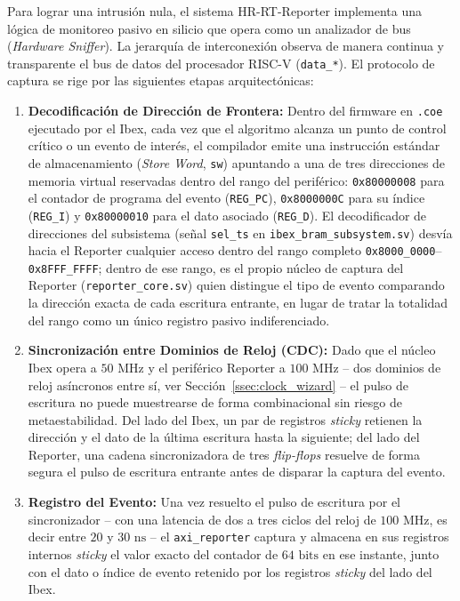Para lograr una intrusión nula, el sistema HR-RT-Reporter implementa una lógica de monitoreo pasivo en silicio que opera como un analizador de bus (\textit{Hardware Sniffer}). La jerarquía de interconexión observa de manera continua y transparente el bus de datos del procesador RISC-V (\texttt{data\_*}). El protocolo de captura se rige por las siguientes etapas arquitectónicas:
\begin{enumerate}
    \item \textbf{Decodificación de Dirección de Frontera:} Dentro del
  firmware en \texttt{.coe} ejecutado por el Ibex, cada vez que el
  algoritmo alcanza un punto de control crítico o un evento de interés, el
  compilador emite una instrucción estándar de almacenamiento
  (\textit{Store Word}, \texttt{sw}) apuntando a una de tres direcciones de
  memoria virtual reservadas dentro del rango del periférico:
  \texttt{0x80000008} para el contador de programa del evento
  (\texttt{REG\_PC}), \texttt{0x8000000C} para su índice
  (\texttt{REG\_I}) y \texttt{0x80000010} para el dato asociado
  (\texttt{REG\_D}). El decodificador de direcciones del subsistema
  (señal \texttt{sel\_ts} en \texttt{ibex\_bram\_subsystem.sv}) desvía
  hacia el Reporter cualquier acceso dentro del rango completo
  \texttt{0x8000\_0000}--\texttt{0x8FFF\_FFFF}; dentro de ese rango, es el
  propio núcleo de captura del Reporter (\texttt{reporter\_core.sv}) quien
  distingue el tipo de evento comparando la dirección exacta de cada
  escritura entrante, en lugar de tratar la totalidad del rango como un
  único registro pasivo indiferenciado.
    \item \textbf{Sincronización entre Dominios de Reloj (CDC):} Dado que
    el núcleo Ibex opera a $50\text{ MHz}$ y el periférico Reporter a
    $100\text{ MHz}$ -- dos dominios de reloj asíncronos entre sí, ver
    Sección~\ref{ssec:clock_wizard} -- el pulso de escritura no puede
    muestrearse de forma combinacional sin riesgo de metaestabilidad. Del
    lado del Ibex, un par de registros \textit{sticky} retienen la
    dirección y el dato de la última escritura hasta la siguiente; del
    lado del Reporter, una cadena sincronizadora de tres
    \textit{flip-flops} resuelve de forma segura el pulso de escritura
    entrante antes de disparar la captura del evento.
    \item \textbf{Registro del Evento:} Una vez resuelto el pulso de
    escritura por el sincronizador -- con una latencia de dos a tres
    ciclos del reloj de $100\text{ MHz}$, es decir entre $20$ y
    $30\text{ ns}$ -- el \texttt{axi\_reporter} captura y almacena en sus
    registros internos \textit{sticky} el valor exacto del contador de
    $64\text{ bits}$ en ese instante, junto con el dato o índice de evento
    retenido por los registros \textit{sticky} del lado del Ibex.
\end{enumerate}

